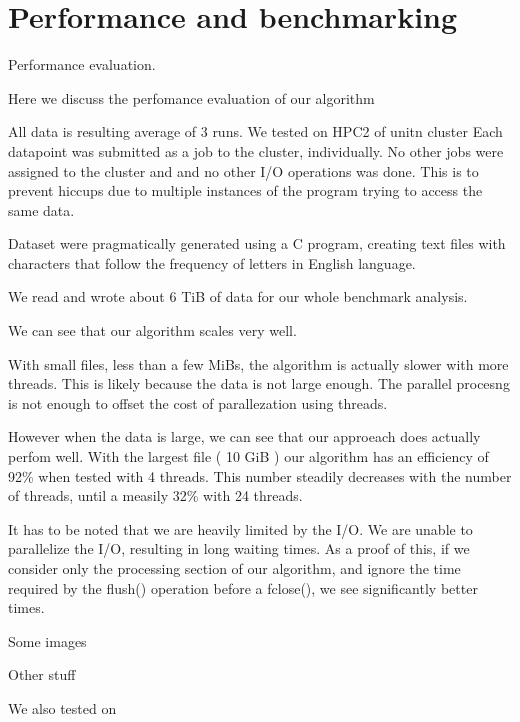 \section{Performance and benchmarking}
Performance evaluation.

Here we discuss the perfomance evaluation of our algorithm


All data is resulting average of 3 runs.
We tested on HPC2 of unitn cluster
Each datapoint was submitted as a job to the cluster, individually. No other jobs were assigned to the cluster and and no other I/O operations was done. This is to prevent hiccups due to multiple instances of the program trying to access the same data.

Dataset were pragmatically generated using a C program, creating text files with characters that follow the frequency of letters in English language.

We read and wrote about 6 TiB of data for our whole benchmark analysis.

We can see that our algorithm scales very well. 

With small files, less than a few MiBs, the algorithm is actually slower with more threads. This is likely because the data is not large enough. The parallel procesng is not enough to offset the cost of parallezation using threads.

However when the data is large, we can see that our approeach does actually perfom well. With the largest file ( 10 GiB ) our algorithm has an efficiency of 92\% when tested with 4 threads. This number steadily decreases with the number of threads, until a measily 32\% with 24 threads.

It has to be noted that we are heavily limited by the I/O. We are unable to parallelize the I/O, resulting in long waiting times. As a proof of this, if we consider only the processing section of our algorithm, and ignore the time required by the flush() operation before a fclose(), we see significantly better times.

Some images

Other stuff



We also tested on